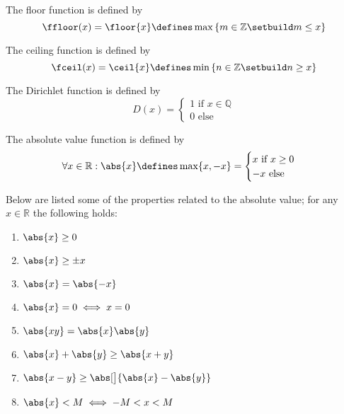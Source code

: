 \begin{definition}\label{def-floor-function}
    The floor function is defined by
    \begin{equation}
        \ffloor(x)=\floor{x}\defines\max\left\{m\in\mathbb{Z}\setbuild m\leq x\right\}
    \end{equation}
\end{definition}

\begin{definition}\label{def-ceiling-function}
    The ceiling function is defined by
    \begin{equation}
        \fceil(x)=\ceil{x}\defines\min\left\{n\in\mathbb{Z}\setbuild n\geq x\right\}
    \end{equation}
\end{definition}

\begin{definition}\label{def-dirichlet-function}
    The Dirichlet function is defined by
    \begin{equation}
        D(x)=\begin{cases}
            1\text{ if }x\in\mathbb{Q}\\
            0\text{ else }
        \end{cases}
    \end{equation}
\end{definition}

\begin{definition}\label{def-absolute-value-function}
    The absolute value function is defined by
    \begin{equation}
        \forall x\in\mathbb{R}: \abs{x}\defines\max\{x,-x\}=\begin{cases}
            x\text{ if } x \geq 0 \\
            -x \text{ else }
        \end{cases}
    \end{equation}
\end{definition}

\begin{thm}\label{thm-absolute-value-properties}
    Below are listed some of the properties related to the absolute value; for
    any $x\in\mathbb{R}$ the following holds:
    \begin{enumerate}
        \item $\abs{x} \geq 0$
        \item $\abs{x} \geq \pm x$
        \item $\abs{x} = \abs{-x}$
        \item $\abs{x} = 0 \iff x = 0$
        \item $\abs{xy} = \abs{x}\abs{y}$
        \item $\abs{x} + \abs{y} \geq \abs{x+y}$
        \item $\abs{x-y} \geq \abs[\big]{\abs{x}-\abs{y}}$
        \item $\abs{x} < M \iff -M < x < M$
    \end{enumerate}
\end{thm}

